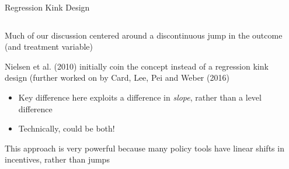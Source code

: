 \documentclass[notes,11pt, aspectratio=169]{beamer}
\newenvironment{wideitemize}{\itemize\addtolength{\itemsep}{10pt}}{\enditemize}
\begin{document}
\begin{frame}{Regression Kink Design}
    \begin{columns}[onlytextwidth, T] %
      \begin{column}{.6\textwidth}
        \begin{wideitemize}
        \item Much of our discussion centered around a discontinuous
          jump in the outcome (and treatment variable)
        \item Nielsen et al. (2010) initially coin the concept instead
          of a regression kink design (further worked on by Card, Lee,
          Pei and Weber (2016)
          \begin{itemize}
          \item Key difference here exploits a difference in
            \emph{slope}, rather than a level difference
          \item Technically, could be both!
          \end{itemize}
        \item This approach is very powerful because many policy tools
          have linear shifts in incentives, rather than jumps
        \end{wideitemize}
      \end{column}%
      \hfill%
      \begin{column}{.4\textwidth}

\end{column}
\end{columns}
\end{frame}
\end{document}
